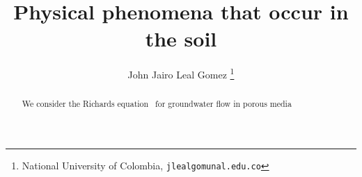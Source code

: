 \documentclass[
	a4paper,
	abstract=true
]
{scrartcl}
\date{}
\title{Physical phenomena that occur in the soil}
\author{John Jairo Leal Gomez
	\thanks{
		National University of Colombia,
		\texttt{jlealgom\MVAt unal.edu.co}}
}
\begin{document}
\maketitle

\begin{abstract}
	We consider the Richards equation~\cite{richards_capillary_1931} for groundwater flow
	in porous media~\cite{bastian1999}

\end{abstract}

\nocite{*}

\end{document}
